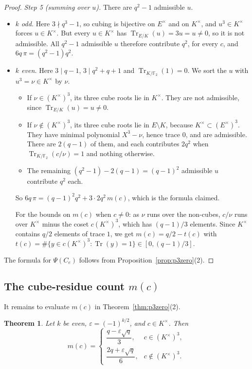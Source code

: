 \documentclass[11pt,a4paper]{amsart}
\newtheorem{theorem}{Theorem}[section]
\theoremstyle{definition}
\theoremstyle{remark}
\newcommand{\F}{\mathbb{F}}
\newcommand{\Tr}{\operatorname{Tr}}
\begin{document}
\begin{proof}
\emph{Step 5 (summing over $u$).} There are $q^2-1$ admissible $u$.
\begin{itemize}
\item \emph{$k$ odd.} Here $3\nmid q^3-1$, so cubing is bijective on $E^\times$ and on $K^\times$, and $u^3\in K^\times$
forces $u\in K^\times$. But every $u\in K^\times$ has $\Tr_{E/K}(u)=3u=u\ne0$, so it is not admissible. All $q^2-1$
admissible $u$ therefore contribute $q^2$, for every $c$, and $6q\,\pi=(q^2-1)q^2$.
\item \emph{$k$ even.} Here $3\mid q-1$, $3\mid q^2+q+1$ and $\Tr_{K/\F_2}(1)=0$. We sort the $u$ with $u^3=\nu\in K^\times$
by $\nu$.
\begin{itemize}
\item If $\nu\in(K^\times)^3$, its three cube roots lie in $K^\times$. They are not admissible, since
$\Tr_{E/K}(u)=u\ne0$.
\item If $\nu\notin(K^\times)^3$, its three cube roots lie in $E\setminus K$, because $K^\times\subset(E^\times)^3$. They
have minimal polynomial $X^3-\nu$, hence trace $0$, and are admissible. There are $2(q-1)$ of them, and each
contributes $2q^2$ when $\Tr_{K/\F_2}(c/\nu)=1$ and nothing otherwise.
\item The remaining $(q^2-1)-2(q-1)=(q-1)^2$ admissible $u$ contribute $q^2$ each.
\end{itemize}
So $6q\,\pi=(q-1)^2q^2+3\cdot2q^2\,m(c)$, which is the formula claimed.

For the bounds on $m(c)$ when $c\ne0$: as $\nu$ runs over the non-cubes, $c/\nu$ runs over $K^\times$ minus the coset
$c(K^\times)^3$, which has $(q-1)/3$ elements. Since $K^\times$ contains $q/2$ elements of trace $1$, we get
$m(c)=q/2-t(c)$ with $t(c)=\#\{y\in c(K^\times)^3:\Tr(y)=1\}\in[0,(q-1)/3]$.
\end{itemize}
The formula for $\Psi(C_e)$ follows from Proposition~\ref{prop:p3zero}(2).
\end{proof}


\subsection{\texorpdfstring{The cube-residue count $m(c)$}{The cube-residue count m(c)}}
It remains to evaluate $m(c)$ in Theorem~\ref{thm:p3zero}(2).


\begin{theorem}\label{thm:mc}
Let $k$ be even, $\varepsilon=(-1)^{k/2}$, and $c\in K^\times$. Then
\[
m(c)=\begin{cases}\dfrac{q-\varepsilon\sqrt q}{3}, & c\in(K^\times)^3,\\[2mm]
\dfrac{2q+\varepsilon\sqrt q}{6}, & c\notin(K^\times)^3.\end{cases}
\]
\end{theorem}
\end{document}
